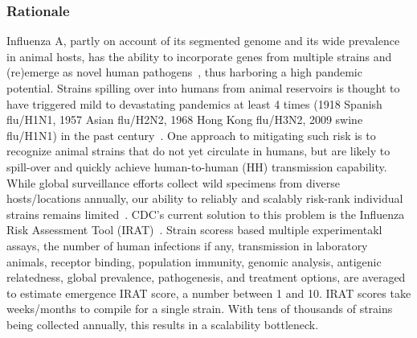 \documentclass[onecolumn, compsoc,11pt]{IEEEtran}
\def\infl{Influenza A\xspace}
\begin{document}
 


\def\bnd{BioNORAD\xspace}
\subsubsection*{Rationale}

  
  
\infl, partly on account of its segmented genome and its wide prevalence in animal hosts, has the ability to incorporate genes from multiple strains and (re)emerge as novel human pathogens~\cite{reid2003origin,dos2016influenza}, thus harboring  a high pandemic potential. Strains spilling over into humans from animal reservoirs is thought to have triggered  mild to devastating pandemics  at least 4 times (1918 Spanish flu/H1N1, 1957 Asian flu/H2N2, 1968 Hong Kong flu/H3N2, 2009 swine flu/H1N1) in the past century~\cite{shao2017evolution}. One  approach to mitigating such risk is to recognize  animal strains  that do not yet circulate in humans, but are likely to spill-over and quickly achieve human-to-human (HH) transmission capability. While global surveillance efforts collect  wild specimens from diverse hosts/locations annually, our  ability to reliably and scalably  risk-rank individual strains remains limited~\cite{wille2021accurately}. CDC's current solution to this problem is the Influenza Risk Assessment Tool (IRAT)~\cite{Influenz24:online}.  Strain scoress based multiple experimentakl assays,  the number of  human infections if any, transmission in laboratory animals, receptor binding, population immunity, genomic analysis, antigenic relatedness, global prevalence,  pathogenesis, and  treatment options,  are averaged to estimate emergence IRAT score, a number between 1 and 10.  IRAT scores  take  weeks/months to compile for a single strain. With tens of   thousands of strains being collected annually, this results in  a scalability bottleneck.
\end{document}
